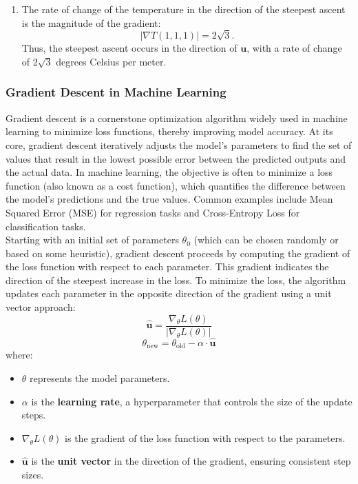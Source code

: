 \begin{example}
\begin{solution}
\begin{enumerate}
    \item The rate of change of the temperature in the direction of the steepest ascent is the magnitude of the gradient:
    \[
    |\nabla T(1, 1, 1)| = 2\sqrt{3}.
    \]
    Thus, the steepest ascent occurs in the direction of \( \mathbf{u} \), with a rate of change of \( 2\sqrt{3} \) degrees Celsius per meter.
\end{enumerate}
\end{solution}
\end{example}
\exampleline



\subsubsection{Gradient Descent in Machine Learning}

Gradient descent is a cornerstone optimization algorithm widely used in machine learning to minimize loss functions, thereby improving model accuracy. At its core, gradient descent iteratively adjusts the model's parameters to find the set of values that result in the lowest possible error between the predicted outputs and the actual data. In machine learning, the objective is often to minimize a loss function (also known as a cost function), which quantifies the difference between the model's predictions and the true values. Common examples include Mean Squared Error (MSE) for regression tasks and Cross-Entropy Loss for classification tasks. \\

\noindent Starting with an initial set of parameters \( \theta_0 \) (which can be chosen randomly or based on some heuristic), gradient descent proceeds by computing the gradient of the loss function with respect to each parameter. This gradient indicates the direction of the steepest increase in the loss. To minimize the loss, the algorithm updates each parameter in the opposite direction of the gradient using a unit vector approach:
\[
\hat{\mathbf{u}} = \frac{\nabla_{\theta} L(\theta)}{|\nabla_{\theta} L(\theta)|}
\]
\[
\theta_{\text{new}} = \theta_{\text{old}} - \alpha \cdot \hat{\mathbf{u}}
\]
where:
\begin{itemize}
    \item \( \theta \) represents the model parameters.
    \item \( \alpha \) is the \textbf{learning rate}, a hyperparameter that controls the size of the update steps.
    \item \( \nabla_{\theta} L(\theta) \) is the gradient of the loss function with respect to the parameters.
    \item \( \hat{\mathbf{u}} \) is the \textbf{unit vector} in the direction of the gradient, ensuring consistent step sizes.
\end{itemize}

